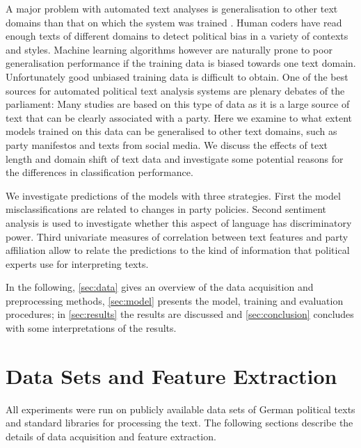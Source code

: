 \documentclass[11pt]{article}
\begin{document}
A major problem with automated text analyses is generalisation to other text domains than that on which the system was trained \cite{Slapin.2014}. Human coders have read enough texts of different domains to detect political bias in a variety of contexts and styles. 
Machine learning algorithms however are naturally prone to poor generalisation performance if the training data is biased towards one text domain. Unfortunately good unbiased training data is difficult to obtain. One of the best sources for automated political text analysis systems are plenary debates of the parliament: Many studies are based on this type of data as it is a large source of text that can be clearly associated with a party. Here we examine to what extent models trained on this data can be generalised to other text domains, such as party manifestos and texts from social media. 
We discuss the effects of text length and domain shift of text data and investigate some potential reasons for the differences in classification performance. 

We investigate predictions of the models with three strategies. First the model misclassifications are related to changes in party policies. Second sentiment analysis is used to investigate whether this aspect of language has discriminatory power. Third univariate measures of correlation between text features and party affiliation allow to relate the predictions to the kind of information that political experts use for interpreting texts. 

In the following, \autoref{sec:data} gives an overview of the data acquisition and preprocessing methods, \autoref{sec:model} presents the model, training and evaluation procedures; in \autoref{sec:results} the results are discussed and \autoref{sec:conclusion} concludes with some interpretations of the results.

\section{Data Sets and Feature Extraction}\label{sec:data}
%
All experiments were run on publicly available data sets of German political texts and standard libraries for processing the text. The following sections describe the details of data acquisition and feature extraction.
\end{document}
